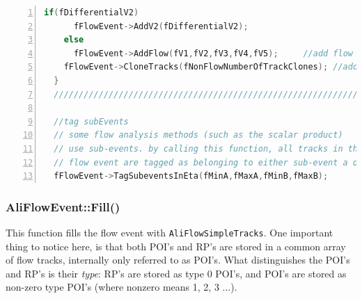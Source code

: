 \documentclass[a4paper]{book}
\numberwithin{equation}{subsection}
\begin{document}
\begin{lstlisting}[language=C, numbers=left]
    if(fDifferentialV2)
      fFlowEvent->AddV2(fDifferentialV2);
    else 
      fFlowEvent->AddFlow(fV1,fV2,fV3,fV4,fV5);     //add flow
    fFlowEvent->CloneTracks(fNonFlowNumberOfTrackClones); //add nonflow by cloning tracks
  }
  //////////////////////////////////////////////////////////////////////////////

  //tag subEvents
  // some flow analysis methods (such as the scalar product) 
  // use sub-events. by calling this function, all tracks in the 
  // flow event are tagged as belonging to either sub-event a or b
  fFlowEvent->TagSubeventsInEta(fMinA,fMaxA,fMinB,fMaxB);\end{lstlisting}

  \subsubsection{AliFlowEvent::Fill()}\label{sec:fill}
  This function fills the flow event with \texttt{AliFlowSimpleTracks}. One important thing to notice here, is that both POI's and RP's are stored in a common array of flow tracks, internally only referred to as POI's. What distinguishes the POI's and RP's is their \emph{type}: RP's are stored as type 0 POI's, and POI's are stored as non-zero type POI's (where nonzero means 1, 2, 3 ...).
\end{document}

